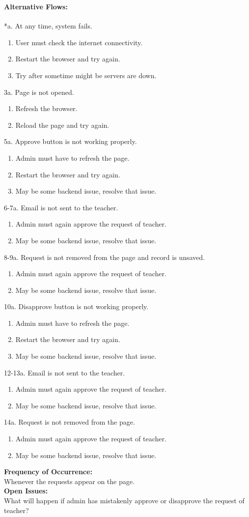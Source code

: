 \documentclass[12pt]{article}
\begin{document}
\textbf{Alternative Flows:}\\
\\
*a. At any time, system fails.
\begin{enumerate}
\item User must check the internet connectivity.
\item Restart the browser and try again.
\item Try after sometime might be servers are down.
\end{enumerate}
3a. Page is not opened.
\begin{enumerate}
\item Refresh the browser.
\item Reload the page and try again.
\end{enumerate}
5a. Approve button is not working properly.
\begin{enumerate}
\item Admin must have to refresh the page.
\item Restart the browser and try again.
\item May be some backend issue, resolve that issue.
\end{enumerate}
6-7a. Email is not sent to the teacher.
\begin{enumerate}
\item Admin must again approve the request of teacher.
\item May be some backend issue, resolve that issue.
\end{enumerate}
8-9a. Request is not removed from the page and record is unsaved.
\begin{enumerate}
\item Admin must again approve the request of teacher.
\item May be some backend issue, resolve that issue.
\end{enumerate}
10a. Disapprove button is not working properly.
\begin{enumerate}
\item Admin must have to refresh the page.
\item Restart the browser and try again.
\item May be some backend issue, resolve that issue.
\end{enumerate}
12-13a. Email is not sent to the teacher.
\begin{enumerate}
\item Admin must again approve the request of teacher.
\item May be some backend issue, resolve that issue.
\end{enumerate}
14a. Request is not removed from the page.
\begin{enumerate}
\item Admin must again approve the request of teacher.
\item May be some backend issue, resolve that issue.
\end{enumerate}
\textbf{Frequency of Occurrence:}\\
Whenever the requests appear on the page.
\\
\textbf{Open Issues:}\\
What will happen if admin has mistakenly approve or disapprove the request of teacher?
\end{document}
